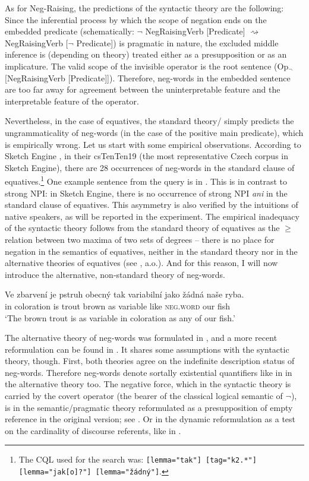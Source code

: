 \documentclass[output=paper,colorlinks,citecolor=brown]{langscibook}
\begin{document}
As for Neg-Raising, the predictions of the syntactic theory are the following: Since the inferential process by which the scope of negation ends on the embedded predicate (schematically: $\neg$ NegRaisingVerb [Predicate] $\rightsquigarrow$ NegRaisingVerb [$\neg$ Predicate]) is pragmatic in nature, the excluded middle inference is (depending on theory) treated either as a presupposition or as an implicature. The valid scope of the invisible operator is the root sentence (Op$_\neg$[NegRaisingVerb [Predicate]]). Therefore, neg-words in the embedded sentence are too far away for agreement between the uninterpretable feature and the interpretable feature of the operator.

Nevertheless, in the case of equatives, the standard theory/\citet{zeijlstra2004sentential} simply predicts the ungrammaticality of neg-words (in the case of the positive main predicate), which is empirically wrong. Let us start with some empirical observations. According to Sketch Engine \citep{kilgarriff2014sketch}, in their csTenTen19 (the most representative Czech corpus in Sketch Engine), there are 28 occurrences of neg-words in the standard clause of equatives.\footnote{The CQL used for the search was: \texttt{[lemma="tak"] [tag="k2.*"] [lemma="jak[o]?"] [lemma="žádný"]}.} One example sentence from the query is in . This is in contrast to strong NPI: in Sketch Engine, there is no occurrence of strong NPI \textit{ani} in the standard clause of equatives. This asymmetry is also verified by the intuitions of native speakers, as will be reported in the experiment. The empirical inadequacy of the syntactic theory follows from the standard theory of equatives as the $\geq$ relation between two maxima of two sets of degrees -- there is no place for negation in the semantics of equatives, neither in the standard theory nor in the alternative theories of equatives (see \citealt{penka2016degree}, a.o.). And for this reason, I will now introduce the alternative, non-standard theory of neg-words.

\ea\label{ex-neg-concord-eq} \gll Ve zbarvení je pstruh obecný tak variabilní jako žádná naše ryba. \\
in coloration is trout brown as variable like \textsc{neg.word} our fish\\
\glt `The brown trout is as variable in coloration as any of our fish.'
\z

\noindent The alternative theory of neg-words was formulated in \citet{ovalle2004double}, and a more recent reformulation can be found in \citet{kuhn2022dynamics}. It shares some assumptions with the syntactic theory, though. First, both theories agree on the indefinite description status of neg-words. Therefore neg-words denote sortally existential quantifiers like in  in the alternative theory too. The negative force, which in the syntactic theory is carried by the covert operator (the bearer of the classical logical semantic of $\neg$), is in the semantic/pragmatic theory reformulated as a presupposition of empty reference in the original version; see . Or in the dynamic reformulation as a test on the cardinality of discourse referents, like in . 
\end{document}
